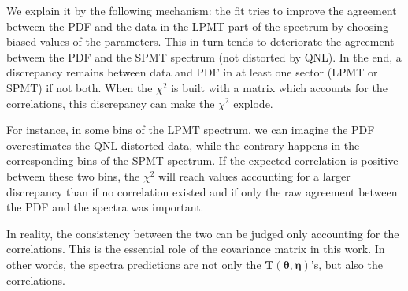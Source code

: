 \documentclass[../main.tex]{subfiles}
\begin{document}
We explain it by the following mechanism: the fit tries to improve the agreement between the PDF and the data in the LPMT part of the spectrum by choosing biased values of the parameters. This in turn tends to deteriorate the agreement between the PDF and the SPMT spectrum (not distorted by QNL). In the end, a discrepancy remains between data and PDF in at least one sector (LPMT or SPMT) if not both. When the $\chi^2$ is built with a matrix which accounts for the correlations, this discrepancy can make the $\chi^2$ explode.

For instance, in some bins of the LPMT spectrum, we can imagine the PDF overestimates the QNL-distorted data, while the contrary happens in the corresponding bins of the SPMT spectrum. If the expected correlation is positive between these two bins, the $\chi^2$ will reach values accounting for a larger discrepancy than if no correlation existed and if only the raw agreement between the PDF and the spectra was important.

In reality, the consistency between the two can be judged only accounting for the correlations. This is the essential role of the covariance matrix in this work. In other words, the spectra predictions are not only the $\bm{T}(\bm{\theta},\bm{\eta})$'s, but also the correlations.
\end{document}
